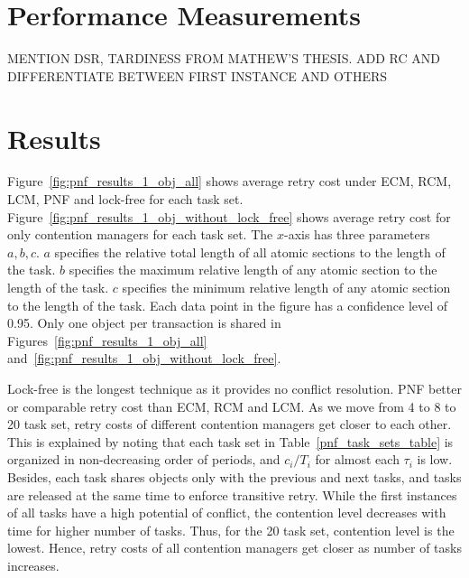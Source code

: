 \section{Performance Measurements}\label{sec:performance_measurements}
%
MENTION DSR, TARDINESS FROM MATHEW'S THESIS. ADD RC AND DIFFERENTIATE BETWEEN FIRST INSTANCE AND OTHERS
%
\section{Results}\label{sec:final_results}
%
Figure~\ref{fig:pnf_results_1_obj_all} shows average retry cost under ECM, RCM, LCM, PNF and lock-free for each task set. Figure~\ref{fig:pnf_results_1_obj_without_lock_free} shows average retry cost for only contention managers for each task set. The $x$-axis has three parameters $a,b,c$. $a$ specifies the relative total length of all atomic sections to the length of the task. $b$ specifies the maximum relative length of any atomic section to the length of the task. $c$ specifies the minimum relative length of any atomic section to the length of the task. Each data point in the figure has a confidence level of 0.95.
Only one object per transaction is shared in Figures~\ref{fig:pnf_results_1_obj_all} and~\ref{fig:pnf_results_1_obj_without_lock_free}.

Lock-free is the longest technique as it provides no conflict resolution. PNF better or comparable retry cost than ECM, RCM and LCM. As we move from 4 to 8 to 20 task set, retry costs of different contention managers get closer to each other. This is explained by noting that each task set in Table~\ref{pnf_task_sets_table} is organized in non-decreasing order of periods, and $c_i/T_i$ for almost each $\tau_i$ is low. Besides, each task shares objects only with the previous and next tasks, and tasks are released at the same time to enforce transitive retry. While the first instances of all tasks have a high potential of conflict, the contention level decreases with time for higher number of tasks. Thus, for the 20 task set, contention level is the lowest. Hence, retry costs of all contention managers get closer as number of tasks increases.

